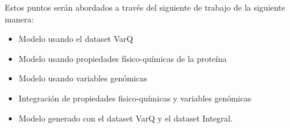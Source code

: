 Estos puntos serán abordados a través del siguiente de trabajo de la siguiente manera:

\begin{itemize}
    \item Modelo usando el dataset VarQ
    \item Modelo usando propiedades físico-químicas de la proteína
    \item Modelo usando variables genómicas
    \item Integración de propiedades fisico-químicas y variables genómicas
    \item Modelo generado con el dataset VarQ y el dataset Integral.
\end{itemize}


